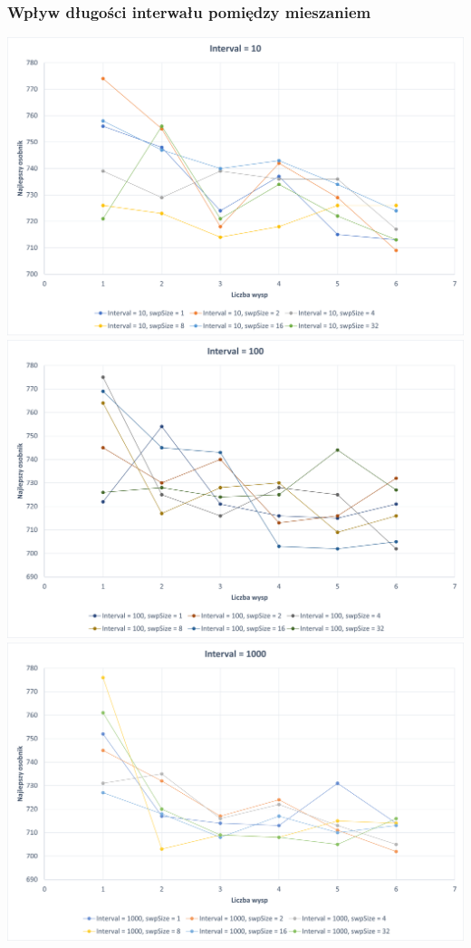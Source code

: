 \documentclass{article}
\begin{document}
\subsubsection*{Wpływ długości interwału pomiędzy mieszaniem}
\includegraphics[scale=0.72]{Interval=10.png}
\includegraphics[scale=0.72]{Interval=100.png}
\includegraphics[scale=0.72]{Interval=1000.png}
\end{document}

